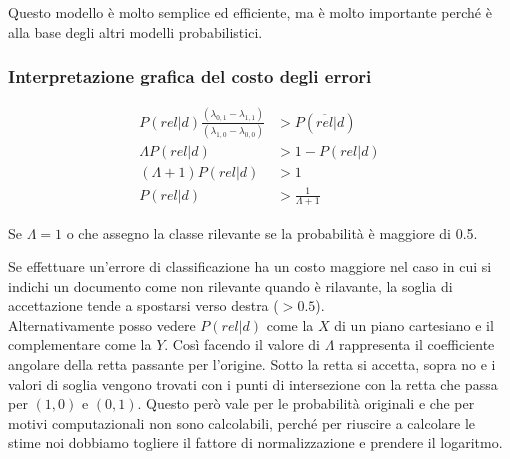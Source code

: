 \noindent Questo modello è molto semplice ed efficiente, ma è molto importante perché è alla base degli altri modelli probabilistici.

\subsubsection{Interpretazione grafica del costo degli errori}

\begin{align*}
P(rel|d) \frac{(\lambda_{0,1} - \lambda_{1,1})}{(\lambda_{1,0} - \lambda_{0,0})} &> P(\overline{rel}|d) \\
\Lambda P(rel|d) &>1 -  P(rel|d) \\
(\Lambda +1 ) P(rel|d) &> 1 \\
P(rel |d ) &> \frac{1 }{\Lambda +1}
\end{align*}

\noindent Se $\Lambda = 1$ o che assegno la classe rilevante se la probabilità è maggiore di 0.5.

Se effettuare un'errore di classificazione ha un costo maggiore nel caso in cui si indichi un documento come non rilevante quando è rilavante, la soglia di accettazione tende a spostarsi verso destra ($> 0.5$).\\

Alternativamente posso vedere $P(rel|d)$ come la $X$ di un piano cartesiano e il complementare come la $Y$. Così facendo il valore di $\Lambda$ rappresenta il coefficiente angolare della retta passante per l'origine. Sotto la retta si accetta, sopra no e i valori di soglia vengono trovati con i punti di intersezione con la retta che passa per $(1,0)$ e $(0,1)$.
Questo però vale per le probabilità originali e che per motivi computazionali non sono calcolabili, perché per riuscire a calcolare le stime noi dobbiamo togliere il fattore di normalizzazione e prendere il logaritmo.


